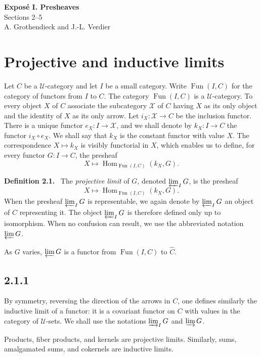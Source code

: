 \documentclass[11pt]{article}
\newcommand{\U}{\mathcal{U}}
\newcommand{\Xcal}{\mathcal{X}}
\newcommand{\Hom}{\operatorname{Hom}}
\newcommand{\Fun}{\operatorname{Fun}}
\newenvironment{statement}[1]{\par\medskip\noindent\textbf{#1.}\ }{\par\medskip}
\begin{document}
\begin{center}
{\Large \textbf{Expos\'e I. Presheaves}}\\[0.35em]
{\large Sections 2--5}\\[0.35em]
A. Grothendieck and J.-L. Verdier
\end{center}

\bigskip


\setcounter{section}{1}
\section{Projective and inductive limits}

Let $C$ be a $\U$-category and let $I$ be a small category. Write $\Fun(I,C)$ for the category of functors from $I$ to $C$. The category $\Fun(I,C)$ is a $\U$-category. To every object $X$ of $C$ associate the subcategory $\Xcal$ of $C$ having $X$ as its only object and the identity of $X$ as its only arrow. Let $i_X:\Xcal\to C$ be the inclusion functor. There is a unique functor $e_X:I\to \Xcal$, and we shall denote by $k_X:I\to C$ the functor $i_X\circ e_X$. We shall say that $k_X$ is the constant functor with value $X$. The correspondence $X\mapsto k_X$ is visibly functorial in $X$, which enables us to define, for every functor $G:I\to C$, the presheaf
\[
X\longmapsto \Hom_{\Fun(I,C)}(k_X,G).
\]

\begin{statement}{Definition 2.1}
The \emph{projective limit} of $G$, denoted $\varprojlim_I G$, is the presheaf
\[
X\longmapsto \Hom_{\Fun(I,C)}(k_X,G).
\]
When the presheaf $\varprojlim_I G$ is representable, we again denote by $\varprojlim_I G$ an object of $C$ representing it. The object $\varprojlim_I G$ is therefore defined only up to isomorphism. When no confusion can result, we use the abbreviated notation $\varprojlim G$.
\end{statement}

As $G$ varies, $\varprojlim G$ is a functor from $\Fun(I,C)$ to $\widehat C$.

\subsection*{2.1.1}
By symmetry, reversing the direction of the arrows in $C$, one defines similarly the inductive limit of a functor: it is a covariant functor on $C$ with values in the category of $\U$-sets. We shall use the notations $\varinjlim_I G$ and $\varinjlim G$.

Products, fiber products, and kernels are projective limits. Similarly, sums, amalgamated sums, and cokernels are inductive limits.
\end{document}
